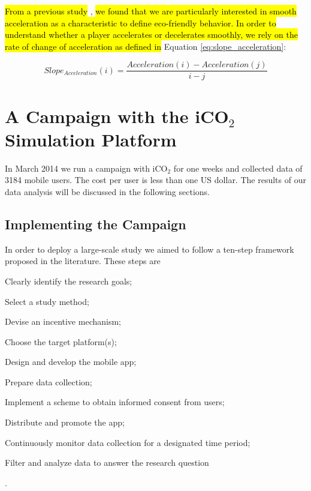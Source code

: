 \documentclass[preprint,authoryear,12pt]{elsarticle}
\newcommand{\hlc}[2][yellow]{ {\sethlcolor{#1} \hl{#2}} }
\begin{document}
\hlc[green]{
From a previous  study
}
\cite{prendingeroliveira2014}, 
\hlc[green]{we found that we are particularly interested in smooth acceleration as a characteristic to define eco-friendly behavior. In order to understand whether a player accelerates or decelerates smoothly, we rely on the rate of change of acceleration as defined in 
}
	Equation \ref{eq:slope_acceleration}:



\begin{equation}\label{eq:slope_acceleration}
Slope_{Acceleration}(i) = \frac{Acceleration(i) - Acceleration(j)}{i-j}
\end{equation}

\section{A Campaign with the iCO$_2$ Simulation Platform}\label{sec:campaign}


In March 2014 we run a campaign with iCO$_2$ for one weeks and collected data of 3184 mobile users. The cost per user is less than one US dollar.
The results of our data analysis will be discussed in the following sections.

\subsection{Implementing the Campaign}
\label{subsec:campaign}

In order to deploy a large-scale study we aimed to follow a ten-step framework proposed in the literature. These steps are \begin{inparaenum}[\itshape 1\upshape)]\item Clearly identify the research goals; \item Select a study method; \item Devise an incentive mechanism;  \item Choose the target platform(s); \item Design and develop the mobile app; \item Prepare data collection; \item Implement a scheme to obtain informed consent from users; \item Distribute and promote the app; \item Continuously monitor data collection for a designated time period; \item Filter and analyze data to answer the research question \end{inparaenum} \citep{Henze2013}.
\end{document}
